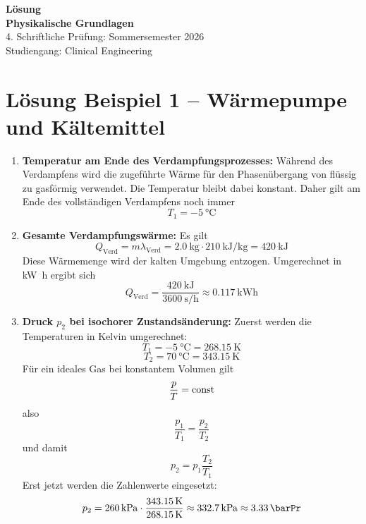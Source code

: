 \documentclass[11pt, a4paper]{article}
\begin{document}
\noindent
\vspace{9cm}
\begin{center}
    {\Huge \textbf{Lösung}} \\[1.5em]
    {\Large \textbf{Physikalische Grundlagen}} \\[1em]
    {\large 4. Schriftliche Prüfung: Sommersemester 2026} \\[1em]
    {\large Studiengang: Clinical Engineering}
\end{center}

\newpage

\section*{Lösung Beispiel 1 -- Wärmepumpe und Kältemittel}
\begin{enumerate}
    \item \textbf{Temperatur am Ende des Verdampfungsprozesses:}
    Während des Verdampfens wird die zugeführte Wärme für den Phasenübergang von flüssig zu gasförmig verwendet. Die Temperatur bleibt dabei konstant. Daher gilt am Ende des vollständigen Verdampfens noch immer
    \[
        T_1 = \SI{-5}{\degreeCelsius}
    \]

    \item \textbf{Gesamte Verdampfungswärme:}
    Es gilt
    \[
        Q_{\text{Verd}} = m \lambda_{\text{Verd}} = \SI{2.0}{\kilogram} \cdot \SI{210}{\kilo\joule\per\kilogram} = \SI{420}{\kilo\joule}
    \]
    Diese Wärmemenge wird der kalten Umgebung entzogen. Umgerechnet in \si{\kilo\watt\hour} ergibt sich
    \[
        Q_{\text{Verd}} = \frac{\SI{420}{\kilo\joule}}{\SI{3600}{\second\per\hour}} \approx \SI{0.117}{\kilo\watt\hour}
    \]

    \item \textbf{Druck $p_2$ bei isochorer Zustandsänderung:}
    Zuerst werden die Temperaturen in Kelvin umgerechnet:
    \[
        T_1 = \SI{-5}{\degreeCelsius} = \SI{268.15}{\kelvin}
    \]
    \[
        T_2 = \SI{70}{\degreeCelsius} = \SI{343.15}{\kelvin}
    \]
    Für ein ideales Gas bei konstantem Volumen gilt
    \[
        \frac{p}{T} = \mathrm{const}
    \]
    also
    \[
        \frac{p_1}{T_1} = \frac{p_2}{T_2}
    \]
    und damit
    \[
        p_2 = p_1 \frac{T_2}{T_1}
    \]
    Erst jetzt werden die Zahlenwerte eingesetzt:
    \[
        p_2 = \SI{260}{\kilo\pascal} \cdot \frac{\SI{343.15}{\kelvin}}{\SI{268.15}{\kelvin}} \approx \SI{332.7}{\kilo\pascal} \approx \SI{3.33}{\barPr}
    \]


\end{enumerate}
\end{document}
